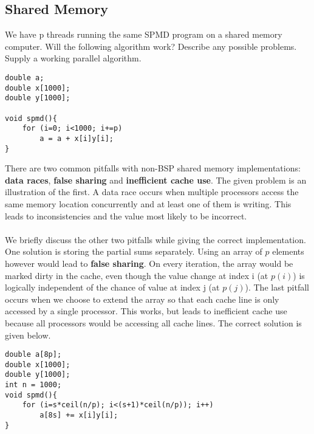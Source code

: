 \documentclass[../main.tex]{subfiles}
\begin{document}
\subsection{Shared Memory}
\begin{question}
We have p threads running the same SPMD program on a shared memory computer. Will the following algorithm work? Describe any possible problems. Supply a working parallel algorithm.
\begin{lstlisting}[caption={SPMD program on a shared memory computer},label=lst:spmd]
double a;
double x[1000];
double y[1000];

void spmd(){
	for (i=0; i<1000; i+=p)
		a = a + x[i]y[i];
}
\end{lstlisting}

\end{question}
\begin{solution}
There are two common pitfalls with non-BSP shared memory implementations: \textbf{data races}, \textbf{false sharing} and \textbf{inefficient cache use}. The given problem is an illustration of the first. A data race occurs when multiple processors access the same memory location concurrently and at least one of them is writing. This leads to inconsistencies and the value most likely to be incorrect.
\\\\
We briefly discuss the other two pitfalls while giving the correct implementation. One solution  is storing the partial sums separately. Using an array of $p$ elements however would lead to \textbf{false sharing}. On every iteration, the array would be marked dirty in the cache, even though the value change at index i (at $p(i)$) is logically independent of the chance of value at index j (at $p(j)$). The last pitfall occurs when we choose to extend the array so that each cache line is only accessed by a single processor. This works, but leads to inefficient cache use because all processors would be accessing all cache lines. The correct solution is given below.

\begin{lstlisting}[caption={SPMD program on a shared memory computer},label=lst:solspmd]
double a[8p];
double x[1000];
double y[1000];
int n = 1000;
void spmd(){
	for (i=s*ceil(n/p); i<(s+1)*ceil(n/p)); i++)
		a[8s] += x[i]y[i];
}
\end{lstlisting}


\end{solution}
\end{document}
